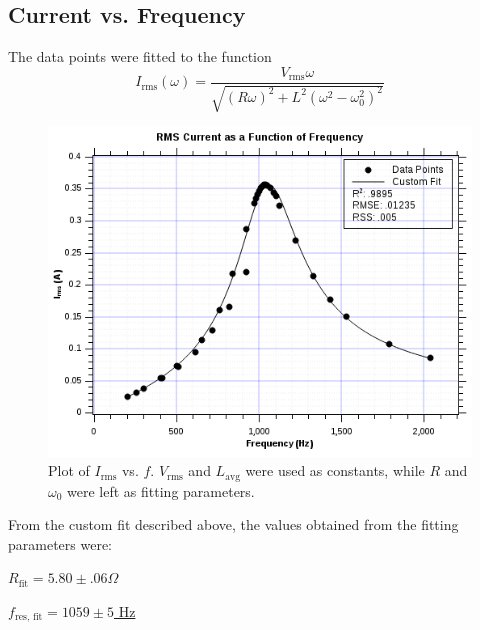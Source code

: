\documentclass[twocolumn,english]{IEEEtran}
\theoremstyle{plain}
\theoremstyle{plain}
\begin{document}
\hrulefill

\subsection{Current vs. Frequency}


The data points were fitted to the function
\begin{equation}
	I_{\text{rms}}(\omega)
	= \frac
	{V_{\text{rms}}\omega}
	{\sqrt{(R\omega)^2 +L^2(\omega^2-\omega_0^2)^2}}
\end{equation}

\begin{figure}[H]
	\begin{centering}
	\begin{center}
	\includegraphics[width=\linewidth]{./Part3.png}
	\caption{Plot of $I_{\text{rms}}$ vs. $f$. $V_{\text{rms}}$ and $L_{\text{avg}}$ were used as constants, while $R$ and $\omega_0$ were left as fitting parameters.}
	\label{fig:IvsFreq}
	\end{center}
	\par\end{centering}
\end{figure}

From the custom fit described above, the values obtained from the fitting parameters were:

\hfill\underline{$R_{\text{fit}} = 5.80 \pm .06 \Omega$}

\hfill\underline{$f_{\text{res, fit}} = 1059 \pm 5$ Hz}
\end{document}
